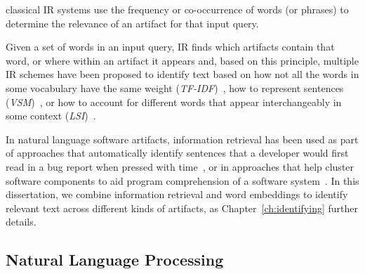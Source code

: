 



 classical \acs{IR} systems use the frequency or co-occurrence of words (or phrases) to determine the relevance of an artifact for that input query.




Given a set of words in an input query,
\acs{IR} finds which artifacts contain that word, or where within an artifact it appears
and, based on this principle, multiple \acs{IR} schemes have been proposed 
to identify text based on 
how not all the words in some vocabulary have the same weight (\textit{TF-IDF})~\cite{luhn1957tf, jones2004idf}, 
how to  represent sentences (\textit{VSM})~\cite{Salton1975vsm}, 
or how to account for different words that appear interchangeably in some context (\textit{LSI})~\cite{dumais1994latent}. 




In natural language software artifacts, 
information retrieval has been used 
as part of approaches that
automatically identify sentences  that a developer would first read in a bug report 
when pressed with time~\cite{Lotufo2012},
or in approaches that help cluster software components to aid program comprehension of a software system~\cite{Marcus2003}.
In this dissertation, we combine information retrieval and word embeddings 
to identify relevant text across different kinds of artifacts, as Chapter~\ref{ch:identifying} further details.

    

% 




\subsection{Natural Language Processing }
\label{cp2:nlp}


